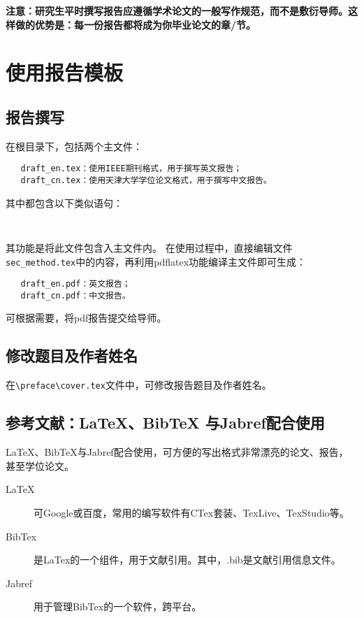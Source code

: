 
\textbf{注意：研究生平时撰写报告应遵循学术论文的一般写作规范，而不是敷衍导师。这样做的优势是：每一份报告都将成为你毕业论文的章/节。}
\section{使用报告模板}
\subsection{报告撰写}

在根目录下，包括两个主文件：
\begin{verbatim}
   draft_en.tex：使用IEEE期刊格式，用于撰写英文报告；
   draft_cn.tex：使用天津大学学位论文格式，用于撰写中文报告。
\end{verbatim}

其中都包含以下类似语句：

\begin{verbatim}
  
\end{verbatim}

其功能是将此文件包含入主文件内。
在使用过程中，直接编辑文件\verb+sec_method.tex+中的内容，再利用pdflatex功能编译主文件即可生成：
\begin{verbatim}
   draft_en.pdf：英文报告；
   draft_cn.pdf：中文报告。
\end{verbatim}

可根据需要，将pdf报告提交给导师。

\subsection{修改题目及作者姓名}

在\verb+\preface\cover.tex+文件中，可修改报告题目及作者姓名。

\subsection{参考文献：\LaTeX、BibTeX 与Jabref配合使用}


\LaTeX 、BibTeX与Jabref配合使用，可方便的写出格式非常漂亮的论文、报告，甚至学位论文。

\begin{description}
  \item[\LaTeX] 可Google或百度，常用的编写软件有CTex套装、TexLive、TexStudio等。
  \item[BibTex] 是LaTex的一个组件，用于文献引用。其中，.bib是文献引用信息文件。
  \item[Jabref] 用于管理BibTex的一个软件，跨平台。
\end{description}


